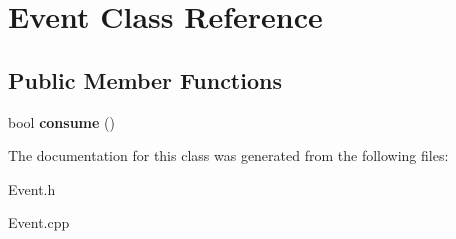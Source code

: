\hypertarget{classEvent}{}\section{Event Class Reference}
\label{classEvent}
\subsection*{Public Member Functions}
\begin{DoxyCompactItemize}
\item 
\mbox{\label{classEvent_a93521bedffd2a0b9c979e15241e060ba}} 
bool {\bfseries consume} ()
\end{DoxyCompactItemize}


The documentation for this class was generated from the following files\+:\begin{DoxyCompactItemize}
\item 
Event.\+h\item 
Event.\+cpp\end{DoxyCompactItemize}
